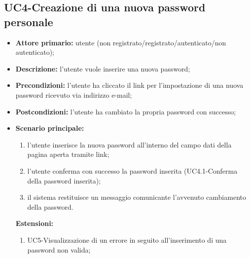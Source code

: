\subsection{UC4-Creazione di una nuova password personale}
\begin{itemize}
	\item \textbf{Attore primario:} utente (non registrato/registrato/autenticato/non autenticato);

	\item \textbf{Descrizione:} l'utente vuole inserire una nuova password;

	\item \textbf{Precondizioni:} l'utente ha cliccato il link per l'impostazione di una nuova password ricevuto via indirizzo e-mail;

	\item \textbf{Postcondizioni:} l'utente ha cambiato la propria password con successo;

	\item \textbf{Scenario principale:}
	\begin{enumerate}
    	\item l'utente inserisce la nuova password all'interno del campo dati della pagina aperta tramite link;
   		\item l'utente conferma con successo la password inserita (UC4.1-Conferma della password inserita);
    	\item il sistema restituisce un messaggio comunicante l'avvenuto cambiamento della password.
	\end{enumerate}

	\textbf{Estensioni:}
	\begin{enumerate}
   		\item UC5-Visualizzazione di un errore in seguito all'inserimento di una password non valida;
	\end{enumerate}
\end{itemize}


